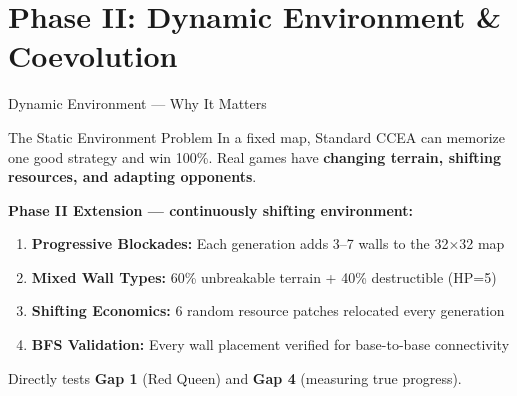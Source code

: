 \documentclass[aspectratio=169, 10pt]{beamer}
\begin{document}
\section{Phase II: Dynamic Environment \& Coevolution}

\begin{frame}{Dynamic Environment --- Why It Matters}
\begin{block}{The Static Environment Problem}
In a fixed map, Standard CCEA can memorize one good strategy and win 100\%. Real games have \textbf{changing terrain, shifting resources, and adapting opponents}.
\end{block}
\vspace{0.15cm}
\textbf{Phase II Extension --- continuously shifting environment:}
\begin{enumerate}
    \item \textbf{Progressive Blockades:} Each generation adds 3--7 walls to the 32$\times$32 map
    \item \textbf{Mixed Wall Types:} 60\% unbreakable terrain + 40\% destructible (HP=5)
    \item \textbf{Shifting Economics:} 6 random resource patches relocated every generation
    \item \textbf{BFS Validation:} Every wall placement verified for base-to-base connectivity
\end{enumerate}
\vspace{0.1cm}
Directly tests \textbf{Gap 1} (Red Queen) and \textbf{Gap 4} (measuring true progress).
\end{frame}
\end{document}
